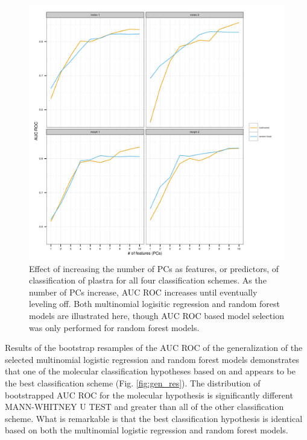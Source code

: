 \documentclass[12pt,letterpaper]{article}\usepackage{graphicx, color}
\begin{document}
\begin{figure}[ht]
  \centering
  \includegraphics[width = \textwidth]{figure/roc_sel}
  \caption{Effect of increasing the number of PCs as features, or predictors, of classification of plastra for all four classification schemes. As the number of PCs increase, AUC ROC increases until eventually leveling off. Both multinomial logisitic regression and random forest models are illustrated here, though AUC ROC based model selection was only performed for random forest models.}
  \label{fig:roc}
\end{figure}


Results of the bootstrap resamples of the AUC ROC of the generalization of the selected multinomial logistic regression and random forest models demonstrates that one of the molecular classification hypotheses based on \citet{Spinks2005} and \citet{Spinks2010} appears to be the best classification scheme (Fig. \ref{fig:gen_res}). The distribution of bootstrapped AUC ROC for the molecular hypothesis is significantly different MANN-WHITNEY U TEST and greater than all of the other classification scheme. What is remarkable is that the best classification hypothesis is identical based on both the multinomial logistic regression and random forest models.
\end{document}
